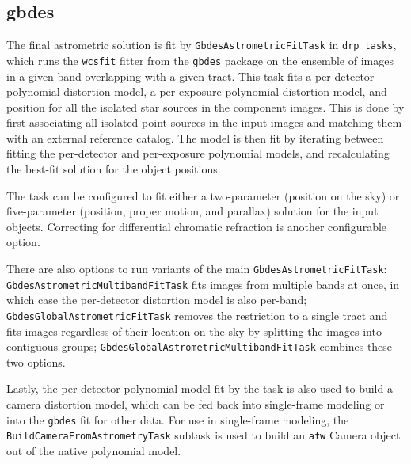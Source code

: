 \subsection{gbdes}
\label{sec:gbdes}
The final astrometric solution is fit by \texttt{GbdesAstrometricFitTask} in \texttt{drp\_tasks}, which runs the \texttt{wcsfit} fitter from the \texttt{gbdes} package \citep{2022ascl.soft10011B,2017PASP..129g4503B} on the ensemble of images in a given band overlapping with a given tract.
This task fits a per-detector polynomial distortion model, a per-exposure polynomial distortion model, and position for all the isolated star sources in the component images.
This is done by first associating all isolated point sources in the input images and matching them with an external reference catalog.
The model is then fit by iterating between fitting the per-detector and per-exposure polynomial models, and recalculating the best-fit solution for the object positions.

The task can be configured to fit either a two-parameter (position on the sky) or five-parameter (position, proper motion, and parallax) solution for the input objects.
Correcting for differential chromatic refraction is another configurable option.

There are also options to run variants of the main \texttt{GbdesAstrometricFitTask}: \texttt{GbdesAstrometricMultibandFitTask} fits images from multiple bands at once, in which case the per-detector distortion model is also per-band; \texttt{GbdesGlobalAstrometricFitTask} removes the restriction to a single tract and fits images regardless of their location on the sky by splitting the images into contiguous groups; \texttt{GbdesGlobalAstrometricMultibandFitTask} combines these two options.

Lastly, the per-detector polynomial model fit by the task is also used to build a camera distortion model, which can be fed back into single-frame modeling or into the \texttt{gbdes} fit for other data.
For use in single-frame modeling, the \texttt{BuildCameraFromAstrometryTask} subtask is used to build an \texttt{afw} Camera object out of the native polynomial model.





